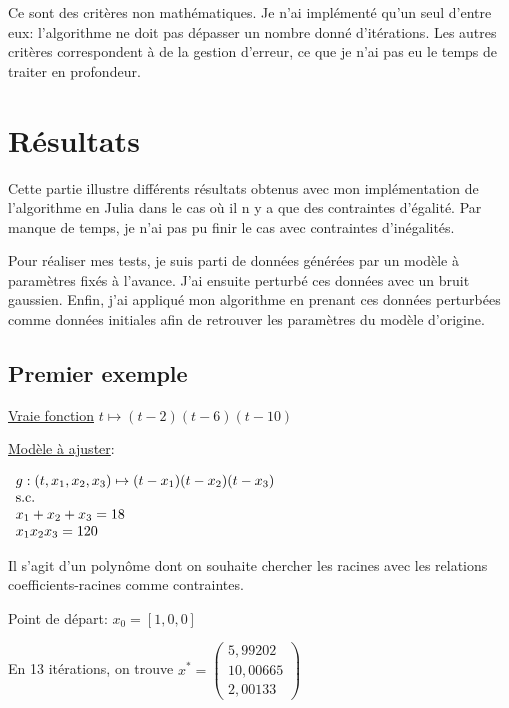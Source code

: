 \documentclass[a4paper,11pt]{article}
\numberwithin{equation}{section}
\begin{document}
Ce sont des critères non mathématiques. Je n'ai implémenté qu'un seul d'entre eux: l'algorithme ne doit pas dépasser un nombre donné d'itérations. Les autres critères correspondent à de la gestion d'erreur, ce que je n'ai pas eu le temps de traiter en profondeur.


\section{Résultats}

Cette partie illustre différents résultats obtenus avec mon implémentation de l'algorithme en Julia dans le cas où il n y a que des contraintes d'égalité. Par manque de temps, je n'ai pas pu finir le cas avec contraintes d'inégalités. 

Pour réaliser mes tests, je suis parti de données générées par un modèle à paramètres fixés à l'avance. J'ai ensuite perturbé ces données avec un bruit gaussien. Enfin, j'ai appliqué mon algorithme en prenant ces données perturbées comme données initiales afin de retrouver les paramètres du modèle d'origine. 

\subsection{Premier exemple}

\underline{Vraie fonction} $t\mapsto (t-2)(t-6)(t-10)$
\newline

\underline{Modèle à ajuster}:

$
\begin{array}{l l l l}
g:(t, x_1, x_2, x_3) \mapsto (t-x_1)(t-x_2)(t-x_3)\\
\text{s.c.}\\
x_1+x_2+x_3 = 18 \\
x_1  x_2  x_3 = 120
\end{array}
$

Il s'agit d'un polynôme dont on souhaite chercher les racines avec les relations coefficients-racines comme contraintes.

Point de départ:
$x_{0} = [1, 0, 0]$

En 13 itérations, on trouve 
 $x^{*} = \begin{pmatrix}
5,99202\\
10,00665\\
2,00133
\end{pmatrix}$

\newpage
\end{document}
